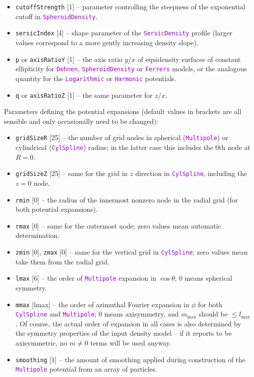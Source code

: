 \documentclass[12pt]{article}
\newcommand{\ttt}[1]{\textcolor{darkviolet}{\texttt{#1}}}
\newcommand{\ppp}[1]{\textcolor{darkolive} {\texttt{#1}}}
\begin{document}
\begin{itemize}
\item \ppp{cutoffStrength} [1] -- parameter controlling the steepness of the exponential cutoff in \ttt{SpheroidDensity}.
\item \ppp{sersicIndex} [4] -- shape parameter of the \ttt{SersicDensity} profile (larger values correspond to a more gently increasing density slope).
\item \ppp{p} or \ppp{axisRatioY} [1] -- the axis ratio $y/x$ of equidensity surfaces of constant ellipticity for \ttt{Dehnen}, \ttt{SpheroidDensity} or \ttt{Ferrers} models, or the analogous quantity for the \ttt{Logarithmic} or \ttt{Harmonic} potentials.
\item \ppp{q} or \ppp{axisRatioZ} [1] -- the same parameter for $z/x$.
\end{itemize}
Parameters defining the potential expansions (default values in brackets are all sensible and only occasionally need to be changed):
\begin{itemize}
\item \ppp{gridSizeR} [25] -- the number of grid nodes in spherical (\ttt{Multipole}) or cylindrical (\ttt{CylSpline}) radius; in the latter case this includes the 0th node at $R=0$. 
\item \ppp{gridSizeZ} [25] -- same for the grid in $z$ direction in \ttt{CylSpline}, including the $z=0$ node.
\item \ppp{rmin} [0] -- the radius of the innermost nonzero node in the radial grid (for both potential expansions).
\item \ppp{rmax} [0] -- same for the outermost node; zero values mean automatic determination.
\item \ppp{zmin} [0], \ppp{zmax} [0] -- same for the vertical grid in \ttt{CylSpline}; zero values mean take them from the radial grid.
\item \ppp{lmax} [6] -- the order of \ttt{Multipole} expansion in $\cos\theta$; 0 means spherical symmetry. 
\item \ppp{mmax} [lmax] -- the order of azimuthal Fourier expansion in $\phi$ for both  \ttt{CylSpline} and \ttt{Multipole}; 0 means axisymmetry, and $m_\mathrm{max}$ should be $\le l_\mathrm{max}$. Of course, the actual order of expansion in all cases is also determined by the symmetry properties of the input density model -- if it reports to be axisymmetric, no $m\ne 0$ terms will be used anyway.
\item \ppp{smoothing} [1] -- the amount of smoothing applied during construction of the \ttt{Multipole} potential from an array of particles.
\end{itemize}
\end{document}
